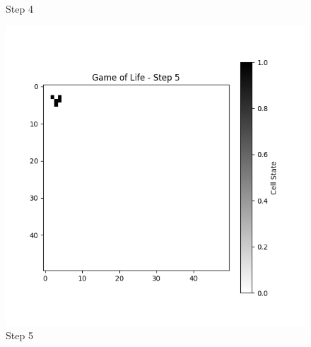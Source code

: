 \documentclass[10pt,letterpaper, onecolumn]{report}
\begin{document}
\begin{flushleft}
\begin{flushleft}
\begin{figure}[htbp!]
\begin{minipage}{0.3\textwidth}
                            \caption{Step 4}
                        \end{minipage}%
                        \begin{minipage}{0.3\textwidth}
                            \centering
                            \includegraphics[width=\textwidth]{../game_of_life_step_Game of Life - Step 5}
                            \caption{Step 5}
                        \end{minipage}
                        \vspace{0.5cm} %
                    

\end{figure}
\end{flushleft}
\end{flushleft}
\end{document}
